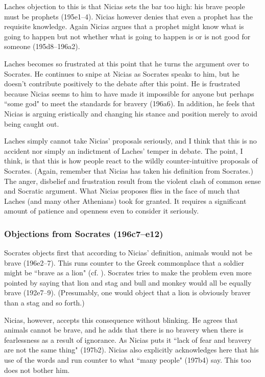 \documentclass[11pt]{article}
\begin{document}
Laches objection to this is that Nicias sets the bar too high: his brave people must be prophets (195e1--4).  Nicias however denies that even a prophet has the requisite knowledge.  Again Nicias argues that a prophet might know what is going to happen but not whether what is going to happen is or is not good for someone (195d8--196a2).

Laches becomes so frustrated at this point that he turns the argument over to Socrates.  He continues to snipe at Nicias as Socrates speaks to him, but he doesn't contribute positively to the debate after this point.  He is frustrated because Nicias seems to him to have made it impossible for anyone but perhaps ``some god" to meet the standards for bravery (196a6).  In addition, he feels that Nicias is arguing eristically and changing his stance and position merely to avoid being caught out.

Laches simply cannot take Nicias' proposals seriously, and I think that this is no accident nor simply an indictment of Laches' temper in debate.  The point, I think, is that this is how people react to the wildly counter-intuitive proposals of Socrates.  (Again, remember that Nicias has taken his definition from Socrates.)  The anger, disbelief and frustration result from the violent clash of common sense and Socratic argument.  What Nicias proposes flies in the face of much that Laches (and many other Athenians) took for granted.  It requires a significant amount of patience and openness even to consider it seriously.


\subsubsection{Objections from Socrates (196c7--e12)}

Socrates objects first that according to Nicias' definition, animals would not be brave (196e2--7).  This runs counter to the Greek commonplace that a soldier might be ``brave as a lion" (cf.  ).  Socrates tries to make the problem even more pointed by saying that lion and stag and bull and monkey would all be equally brave (192e7--9).  (Presumably, one would object that a lion is obviously braver than a stag and so forth.)

Nicias, however, accepts this consequence without blinking.  He agrees that animals cannot be brave, and he adds that there is no bravery when there is fearlessness as a result of ignorance.  As Nicias puts it ``lack of fear and bravery are not the same thing" (197b2).  Nicias also explicitly acknowledges here that his use of the words  and  run counter to what ``many people" (197b4) say.  This too does not bother him.
\end{document}
